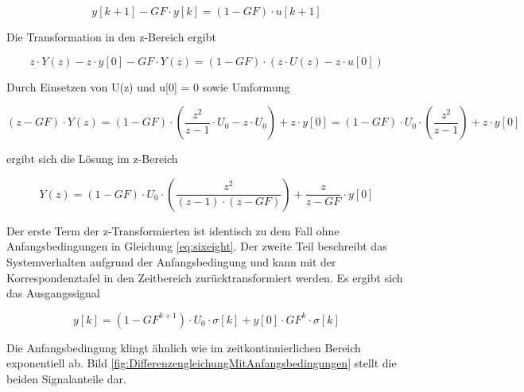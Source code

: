 \begin{equation}\label{eq:sixfiveteen}
y\left[k+1\right]-GF\cdot y\left[k\right]=\left(1-GF\right)\cdot u\left[k+1\right]
\end{equation}

\noindent Die Transformation in den z-Bereich ergibt

\begin{equation}\label{eq:sixsixteen}
z\cdot Y\left(z\right)-z\cdot y\left[0\right]-GF\cdot Y\left(z\right)=\left(1-GF\right)\cdot \left(z\cdot U\left(z\right)-z\cdot u\left[0\right]\right)
\end{equation}

\noindent Durch Einsetzen von U(z) und u[0] = 0 sowie Umformung

\begin{equation}\label{eq:sixseventeen}
\left(z-GF\right)\cdot Y\left(z\right)=\left(1-GF\right)\cdot \left(\frac{z^{2} }{z-1} \cdot U_{0} -z\cdot U_{0} \right)+z\cdot y\left[0\right]=\left(1-GF\right)\cdot U_{0} \cdot \left(\frac{z^{2} }{z-1} \right)+z\cdot y\left[0\right]
\end{equation}

\noindent ergibt sich die L\"{o}sung im z-Bereich

\begin{equation}\label{eq:sixeighteen}
Y\left(z\right)=\left(1-GF\right)\cdot U_{0} \cdot \left(\frac{z^{2} }{\left(z-1\right)\cdot \left(z-GF\right)} \right)+\frac{z}{z-GF} \cdot y\left[0\right]
\end{equation}

\noindent Der erste Term der z-Transformierten ist identisch zu dem Fall ohne Anfangsbedingungen in Gleichung \eqref{eq:sixeight}. Der zweite Teil beschreibt das Systemverhalten aufgrund der Anfangsbedingung und kann mit der Korrespondenztafel in den Zeitbereich zur\"{u}cktransformiert werden. Es ergibt sich das Ausgangssignal

\begin{equation}\label{eq:sixnineteen}
y\left[k\right]=\left(1-GF^{k+1} \right)\cdot U_{0} \cdot \sigma \left[k\right]+y\left[0\right]\cdot GF^{k} \cdot \sigma \left[k\right]
\end{equation}

\noindent Die Anfangsbedingung klingt \"{a}hnlich wie im zeitkontinuierlichen Bereich exponentiell ab. Bild \ref{fig:DifferenzengleichungMitAnfangsbedingungen} stellt die beiden Signalanteile dar.


